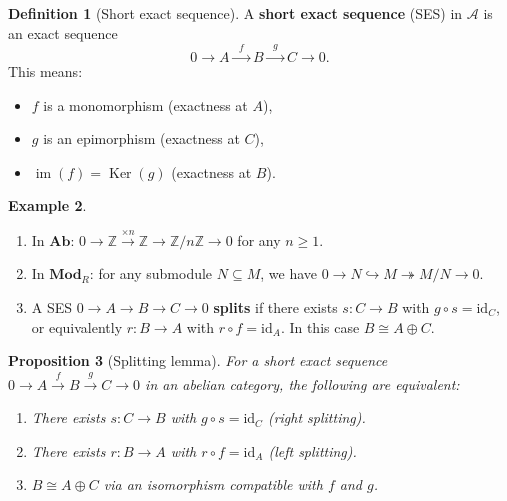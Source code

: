 \documentclass[a4paper,12pt]{book}
\DeclareMathOperator{\im}{im}
\DeclareMathOperator{\Ker}{Ker}
\newcommand{\Ab}{\mathbf{Ab}}
\newcommand{\Mod}{\mathbf{Mod}}
\newcommand{\id}{\mathrm{id}}
\theoremstyle{definition}
\newtheorem{definition}{Definition}[section]
\newtheorem{example}[definition]{Example}
\theoremstyle{plain}
\newtheorem{proposition}[definition]{Proposition}
\theoremstyle{remark}
\begin{document}
\begin{definition}[Short exact sequence]\label{def:ses}
A \textbf{short exact sequence} (SES) in $\mathcal{A}$ is an exact sequence
\[
    0 \longrightarrow A \xrightarrow{\;\;f\;\;} B \xrightarrow{\;\;g\;\;} C \longrightarrow 0.
\]
This means:
\begin{itemize}
    \item $f$ is a monomorphism (exactness at $A$),
    \item $g$ is an epimorphism (exactness at $C$),
    \item $\im(f) = \Ker(g)$ (exactness at $B$).
\end{itemize}
\end{definition}

\begin{example}\label{ex:ses-examples}
\begin{enumerate}
    \item In $\Ab$: $0 \to \mathbb{Z} \xrightarrow{\times n} \mathbb{Z} \to \mathbb{Z}/n\mathbb{Z} \to 0$
    for any $n \geq 1$.
    \item In $\Mod_R$: for any submodule $N \subseteq M$, we have
    $0 \to N \hookrightarrow M \twoheadrightarrow M/N \to 0$.
    \item A SES $0 \to A \to B \to C \to 0$ \textbf{splits}
    if there exists $s \colon C \to B$ with $g \circ s = \id_C$, or equivalently
    $r \colon B \to A$ with $r \circ f = \id_A$. In this case $B \cong A \oplus C$.
\end{enumerate}
\end{example}

\begin{proposition}[Splitting lemma]\label{prop:splitting-lemma}
For a short exact sequence $0 \to A \xrightarrow{f} B \xrightarrow{g} C \to 0$
in an abelian category, the following are equivalent:
\begin{enumerate}
    \item There exists $s \colon C \to B$ with $g \circ s = \id_C$ (right splitting).
    \item There exists $r \colon B \to A$ with $r \circ f = \id_A$ (left splitting).
    \item $B \cong A \oplus C$ via an isomorphism compatible with $f$ and $g$.
\end{enumerate}
\end{proposition}
\end{document}
